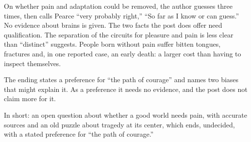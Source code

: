 \begin{afterword}
On whether pain and adaptation could be removed, the author guesses three times, then calls Pearce ``very probably right,'' ``So far as I know or can guess.'' No evidence about brains is given. The two facts the post does offer need qualification. The separation of the circuits for pleasure and pain is less clear than ``distinct'' suggests. People born without pain suffer bitten tongues, fractures and, in one reported case, an early death: a larger cost than having to inspect themselves.

The ending states a preference for ``the path of courage'' and names two biases that might explain it. As a preference it needs no evidence, and the post does not claim more for it.

In short: an open question about whether a good world needs pain, with accurate sources and an old puzzle about tragedy at its center, which ends, undecided, with a stated preference for ``the path of courage.''
\end{afterword}
